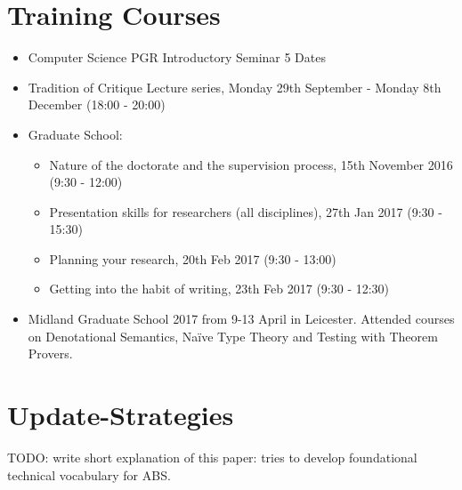 \begin{appendices}

\chapter{Training Courses}
\begin{itemize}
\item Computer Science PGR Introductory Seminar 5 Dates
\item Tradition of Critique Lecture series, Monday 29th September - Monday 8th December (18:00 - 20:00)
\item Graduate School: 
	\begin{itemize}	
		\item Nature of the doctorate and the supervision process, 15th November 2016 (9:30 - 12:00)
		\item Presentation skills for researchers (all disciplines), 27th Jan 2017 (9:30 - 15:30)
		\item Planning your research, 20th Feb 2017 (9:30 - 13:00)
		\item Getting into the habit of writing, 23th Feb 2017 (9:30 - 12:30)
	\end{itemize}
\item Midland Graduate School 2017 from 9-13 April in Leicester. Attended courses on Denotational Semantics, Naïve Type Theory and Testing with Theorem Provers.
\end{itemize}



\chapter{Update-Strategies}
TODO: write short explanation of this paper: tries to develop foundational technical vocabulary for ABS.


\end{appendices}
